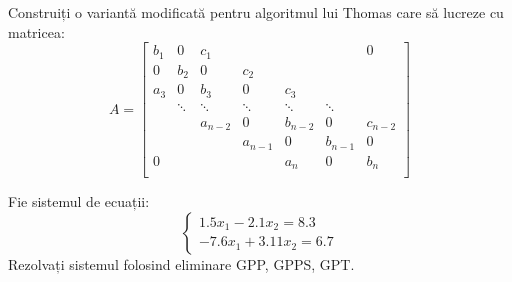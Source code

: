 \documentclass{exam}
\begin{document}
\begin{questions}
	\boxedpoints
	\pointsinmargin

	\question Construiți o variantă modificată pentru algoritmul lui Thomas care
	să lucreze cu matricea:
	\begin{equation*}
		A = \begin{bmatrix}
			b_1 & 0      & c_1       &           &           &           & 0         \\
			0   & b_2    & 0         & c_2       &           &           &           \\
			a_3 & 0      & b_3       & 0         & c_3       &           &           \\
			    & \ddots & \ddots    & \ddots    & \ddots    & \ddots    &           \\
			    &        & a_{n - 2} & 0         & b_{n - 2} & 0         & c_{n - 2} \\
			    &        &           & a_{n - 1} & 0         & b_{n - 1} & 0         \\
			0   &        &           &           & a_n       & 0         & b_n       \\
		\end{bmatrix}
	\end{equation*}

	\question Fie sistemul de ecuații:
	\begin{equation*}
		\begin{cases}
			1.5  x_1 - 2.1 x_2 = 8.3 \\
			-7.6 x_1 + 3.11 x_2 = 6.7
		\end{cases}
	\end{equation*}
	Rezolvați sistemul folosind eliminare GPP, GPPS, GPT.

\end{questions}
\end{document}
